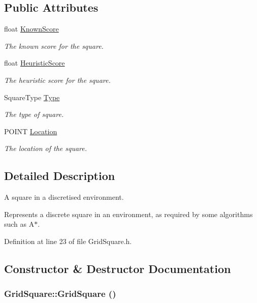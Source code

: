 \subsection*{Public Attributes}
\begin{CompactItemize}
\item 
float \hyperlink{class_grid_square_c9bf6cff92f3931e306e94c8fd0711a0}{Known\-Score}
\begin{CompactList}\small\item\em The known score for the square. \item\end{CompactList}\item 
float \hyperlink{class_grid_square_996fc2957740a41fa537e9c81ac6a9ac}{Heuristic\-Score}
\begin{CompactList}\small\item\em The heuristic score for the square. \item\end{CompactList}\item 
Square\-Type \hyperlink{class_grid_square_c6541480f1e2b8a281aae84b357b8024}{Type}
\begin{CompactList}\small\item\em The type of square. \item\end{CompactList}\item 
POINT \hyperlink{class_grid_square_fc056ec707b8419556574e4ea9244a48}{Location}
\begin{CompactList}\small\item\em The location of the square. \item\end{CompactList}\end{CompactItemize}


\subsection{Detailed Description}
A square in a discretised environment. 

Represents a discrete square in an environment, as required by some algorithms such as A$\ast$. 



Definition at line 23 of file Grid\-Square.h.

\subsection{Constructor \& Destructor Documentation}
\hypertarget{class_grid_square_17522bbd8d99669f23ce79cc016ff945}{
\subsubsection[GridSquare]{\setlength{\rightskip}{0pt plus 5cm}Grid\-Square::Grid\-Square ()}}
\label{class_grid_square_17522bbd8d99669f23ce79cc016ff945}


